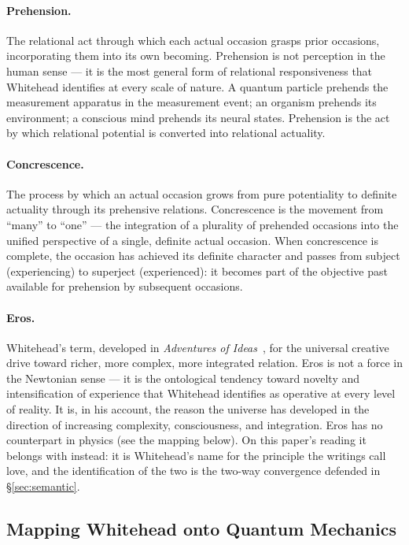 \paragraph{Prehension.}
The relational act through which each actual occasion grasps prior
occasions, incorporating them into its own becoming.
Prehension is not perception in the human sense --- it is the most
general form of relational responsiveness that Whitehead identifies
at every scale of nature.
A quantum particle prehends the measurement apparatus in the measurement
event; an organism prehends its environment; a conscious mind prehends
its neural states.
Prehension is the act by which relational potential is converted into
relational actuality.

\paragraph{Concrescence.}
The process by which an actual occasion grows from pure potentiality to
definite actuality through its prehensive relations.
Concrescence is the movement from ``many'' to ``one'' --- the integration
of a plurality of prehended occasions into the unified perspective of
a single, definite actual occasion.
When concrescence is complete, the occasion has achieved its definite
character and passes from subject (experiencing) to superject (experienced):
it becomes part of the objective past available for prehension by
subsequent occasions.

\paragraph{Eros.}
Whitehead's term, developed in \textit{Adventures of Ideas}~\citep{Whitehead1933},
for the universal creative drive toward richer, more complex, more integrated
relation.
Eros is not a force in the Newtonian sense --- it is the ontological
tendency toward novelty and intensification of experience that Whitehead
identifies as operative at every level of reality.
It is, in his account, the reason the universe has developed in the
direction of increasing complexity, consciousness, and integration.
Eros has no counterpart in physics (see the mapping below).
On this paper's reading it belongs with \mahabbat instead: it is
Whitehead's name for the principle the \bahai writings call love, and the
identification of the two is the two-way convergence defended in
\S\ref{sec:semantic}.

\subsection{Mapping Whitehead onto Quantum Mechanics}

